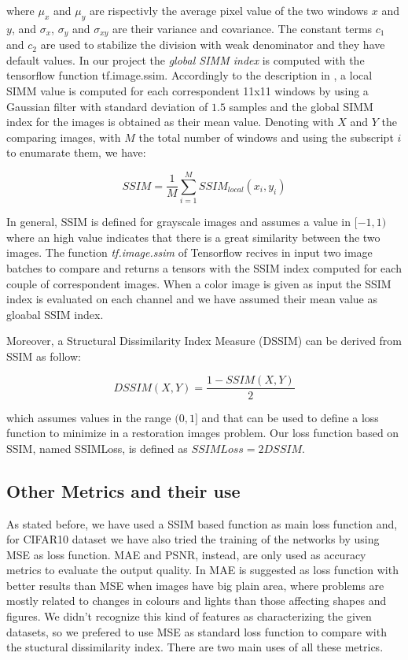 \documentclass[12pt,a4paper]{article}
\begin{document}
where $\mu_x$ and $\mu_y$ are rispectivly the average pixel value of the two windows $x$ and $y$, and $\sigma_x$, $\sigma_y$ and $\sigma_{xy}$ are their variance and covariance. The constant terms $c_1$ and $c_2$ are used to stabilize the division with weak denominator and they have default values. In our project the \textit{global SIMM index} is computed with the tensorflow function tf.image.ssim. Accordingly to the description in \cite{W&B}, a local SIMM value is computed for each correspondent 11x11 windows by using a Gaussian filter with standard deviation of $1.5$ samples and the global SIMM index for the images is obtained as their mean value. Denoting with $X$ and $Y$ the comparing images, with $M$ the total number of windows and using the subscript $i$ to enumarate them, we have:

\begin{equation}
SSIM = \frac{1}{M}\sum_{i=1}^M SSIM_{local}(x_i,y_i)
\end{equation}

In general, SSIM is defined for grayscale images and assumes a value in $[-1,1)$ where an high value indicates that there is a great similarity between the two images. The function \emph{tf.image.ssim} of Tensorflow recives in input two image batches to compare and returns a tensors with the SSIM index computed for each couple of correspondent images. When a color image is given as input the SSIM index is evaluated on each channel and we have assumed their mean value as gloabal SSIM index.

Moreover, a Structural Dissimilarity Index Measure (DSSIM) can be derived from SSIM as follow:

\begin{equation}
DSSIM(X,Y) = \frac{1-SSIM(X,Y)}{2}
\end{equation} 

which assumes values in the range $(0,1]$ and that can be used to define a loss function to minimize in a restoration images problem. Our loss function based on SSIM, named SSIMLoss, is defined as $SSIMLoss = 2 DSSIM$.



\subsection{Other Metrics and their use}
As stated before, we have used a SSIM based function as main loss function and, for CIFAR10 dataset we have also tried the training of the networks by using MSE as loss function. MAE and PSNR, instead, are only used as accuracy metrics to evaluate the output quality. In \cite{Z&G&F} MAE is suggested as loss function with better results than MSE when images have big plain area, where problems are mostly related to changes in colours and lights than those affecting shapes and figures. We didn't recognize this kind of features as characterizing the given datasets, so we prefered to use MSE as standard loss function to compare with the stuctural dissimilarity index. There are two main uses of all these metrics.
\end{document}

